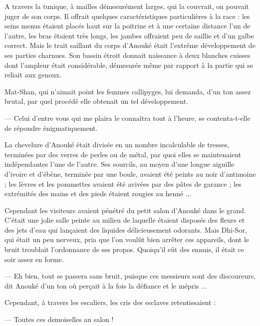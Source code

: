 \documentclass[a4paper, 11pt, oneside, polutonikogreek, french]{article}
\begin{document}
A travers la tunique, à mailles démesurément larges, qui la couvrait, on pouvait juger de son corps. Il offrait quelques caractéristiques particulières à la race : les seins menus étaient placés haut sur la poitrine et à une certaine distance l'un de l'autre, les bras étaient très longs, les jambes offraient peu de saillie et d'un galbe correct. Mais le trait saillant du corps d'Anouké était l'extrême développement de ses parties charnues. Son bassin étroit donnait naissance à deux blanches cuisses dont l'ampleur était considérable, démesurée même par rapport à la partie qui se reliait aux genoux.

Mat-Shan, qui n'aimait point les femmes callipyges, lui demanda, d'un ton assez brutal, par quel procédé elle obtenait un tel développement.

--- Celui d'entre vous qui me plaira le connaîtra tout à l'heure, se contenta-t-elle de répondre énigmatiquement.

La chevelure d'Anouké était divisée en un nombre incalculable de tresses, terminées par des verres de perles ou de métal, par quoi elles se maintenaient indépendantes l'une de l'autre. Ses sourcils, au moyen d'une longue aiguille d'ivoire et d'ébène, terminée par une boule, avaient été peints au noir d'antimoine ; les lèvres et les pommettes avaient été avivées par des pâtes de garance ; les extrémités des mains et des pieds étaient rougies au henné ...

\bigskip
\centerline{\EightStarTaper}
\centerline{\EightStarTaper\EightStarTaper}
\bigskip

Cependant les visiteurs avaient pénétré du petit salon d'Anouké dans le grand. C'était une jolie salle peinte au milieu de laquelle étaient disposés des fleurs et des jets d'eau qui lançaient des liquides délicieusement odorants. Mais Dhi-Sor, qui était un peu nerveux, pria que l'on voulût bien arrêter ces appareils, dont le bruit troublait l'ordonnance de ses propos. Quoiqu'il eût des ennuis, il était ce soir assez en forme.

--- Eh bien, tout se passera sans bruit, puisque ces messieurs sont des discoureurs, dit Anouké d'un ton où perçait à la fois la défiance et le mépris ...

\bigskip
\centerline{\EightStarTaper}
\centerline{\EightStarTaper\EightStarTaper}
\bigskip

Cependant, à travers les escaliers, les cris des esclaves retentissaient :

--- Toutes ces demoiselles au salon !
\end{document}
